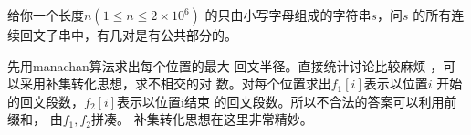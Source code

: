 \begin{prob}
	给你一个长度$n(1 \le n \le 2 \times 10^6)$ 
	的只由小写字母组成的字符串$s$，问$s$
	的所有连续回文子串中，有几对是有公共部分的。
\end{prob}

\begin{sol}
	先用manachan算法求出每个位置的最大
	回文半径。直接统计讨论比较麻烦
	，可以采用补集转化思想，求不相交的对
	数。对每个位置求出$f_1[i]$表示以位置$i$
	开始的回文段数，$f_2[i]$表示以位置i结束
	的回文段数。所以不合法的答案可以利用前缀和，
	由$f_1,f_2$拼凑。
	补集转化思想在这里非常精妙。
\end{sol}
